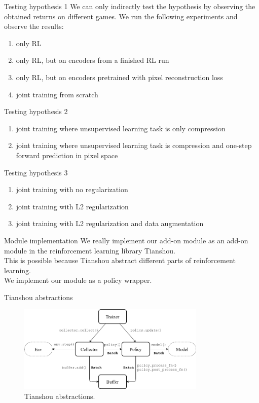 \documentclass{beamer}
\begin{document}
\begin{frame}{Testing hypothesis 1}
We can only indirectly test the hypothesis by observing the obtained returns
on different games. We run the following experiments and observe the results:
\begin{enumerate}
		\item only RL
		\item only RL, but on encoders from a finished RL run
		\item only RL, but on encoders pretrained with pixel reconstruction loss
		\item joint training from scratch
\end{enumerate}
\end{frame}


\begin{frame}{Testing hypothesis 2}
\begin{enumerate}
		\item joint training where unsupervised learning task is only compression
		\item joint training where unsupervised learning task is compression 
				and one-step forward prediction in pixel space
\end{enumerate}
\end{frame}


\begin{frame}{Testing hypothesis 3}
\begin{enumerate}
		\item joint training with no regularization
		\item joint training with L2 regularization
		\item joint training with L2 regularization and data augmentation
\end{enumerate}
\end{frame}


\begin{frame}{Module implementation}
We really implement our add-on module as an add-on module in 
the reinforcement learning library Tianshou. \\
This is possible because Tianshou abstract different parts of reinforcement learning.\\
We implement our module as a policy wrapper.
\end{frame}

\begin{frame}{Tianshou abstractions}
\begin{figure}[htpb]
		\centering
		\includegraphics[width=0.8\textwidth]{"../thesis_text/figure/concepts_arch2.png"}
		\caption{Tianshou abstractions.}
		\label{tianshouconcepts}
\end{figure}
\end{frame}
\end{document}
